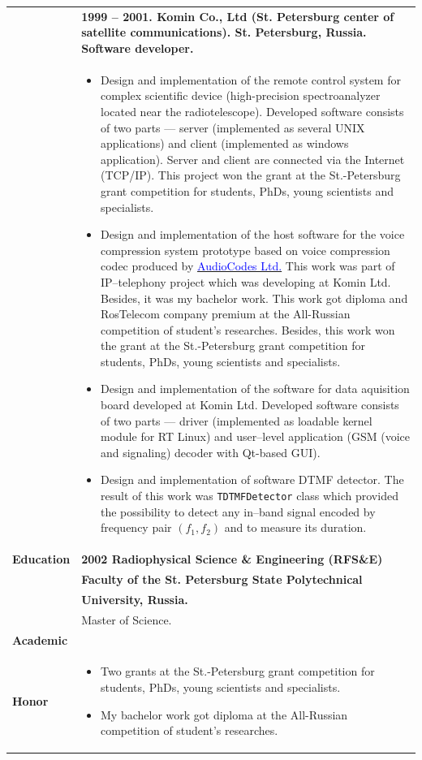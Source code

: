 \documentclass[a4paper]{article}
\newcommand{\myhref}[2]{\href{#1}{\textcolor{blue}{#2}}}
\begin{document}
\newpage

\begin{tabular}{lp{12cm}}
& \bf 1999 -- 2001. Komin Co., Ltd (St. Petersburg center of satellite communications). St. Petersburg, Russia. Software developer.\\[-.5cm]
& \begin{itemize}
\item Design and implementation
of the remote control system for complex scientific device 
(high-precision spectroanalyzer located near the radiotelescope).
Developed software consists of two parts --- server (implemented as several
UNIX applications) and client (implemented as windows application).
Server and client are connected via the Internet (TCP/IP). 
This project won the grant at the St.-Petersburg grant
competition for students, PhDs, young scientists  and specialists.
\item Design and implementation of the host software for the  
voice compression system prototype based on voice compression codec produced by
\myhref{http://www.audiocodes.com}{AudioCodes Ltd.}
This work was part of IP--telephony project which was developing at 
Komin Ltd.  Besides, it was my bachelor work.  
This work got diploma and RosTelecom company premium at the All-Russian 
competition of student's researches.
Besides, this work won the grant at the St.-Petersburg grant competition
for students, PhDs, young scientists  and specialists.
\item Design and implementation of the software for data aquisition board
developed at Komin Ltd.
Developed software consists of two parts --- driver (implemented as loadable 
kernel module for RT Linux) and user--level application (GSM (voice and signaling) decoder with
Qt-based GUI).
\item Design and implementation of software DTMF 
detector.  The result of this work was \texttt{TDTMFDetector}
class which provided the possibility
to detect any in--band signal encoded by frequency pair $(f_1, f_2)$ and
to measure its duration.
\end{itemize}\\
\bf Education& \bf 2002  Radiophysical Science \& Engineering (RFS\&E)\\
& \bf Faculty of the  St. Petersburg State Polytechnical\\
& \bf University, Russia.\\
& Master of Science.\\
\bf Academic\\
\bf Honor & \vspace*{-1cm}\begin{itemize}
\item Two grants at the St.-Petersburg grant competition
for students, PhDs, young scientists  and specialists.
\item My bachelor work got diploma at the All-Russian competition of student's researches.
\end{itemize}
\end{tabular}
\end{document}
